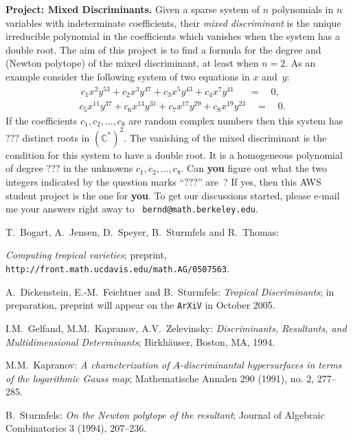 \documentclass[12pt]{amsart}
\newcommand{\baseRing}[1]{\ensuremath{\mathbb{#1}}}
\newcommand{\C}{\baseRing{C}}
\theoremstyle{plain}
\theoremstyle{definition}
\numberwithin{equation}{section}
\begin{document}
\bigskip

{\bf Project: Mixed Discriminants.}
Given a sparse system of $n$ polynomials in $n$ variables
with indeterminate  coefficients, their {\em mixed discriminant}
is the unique irreducible polynomial in the coefficients
which vanishes when the system has a double root.
The aim of this project is to find a formula for the degree 
and (Newton polytope) of the mixed discriminant, at least
when $n=2$. As an example consider the 
following system of two equations in $x$ and~$y$:
\begin{eqnarray*}
& \, c_1 x^2 y^{53} + 
c_2 x^3 y^{47} + 
c_3 x^5 y^{43} + 
c_4 x^7 y^{41}\,\,\,
\quad = \quad 0 , \\ &
c_5 x^{11} y^{37} + 
c_6 x^{13} y^{31} + 
c_7 x^{17} y^{29} + 
c_8 x^{19} y^{23}
\quad = \quad 0. 
\end{eqnarray*}
If the coefficients $c_1,c_2,\ldots,c_8$ are random complex
numbers then this system has $???$ distinct roots in $(\C^*)^2$.
The vanishing of the mixed discriminant is the condition
for this system to have a double root.
It is a homogeneous polynomial of degree $???$ in
the unknowns $c_1,c_2,\ldots,c_8$. Can
{\bf you} figure out what the two integers 
indicated by the question marks ``$ ???$'' are~?
If yes, then this AWS student project is the one for {\bf you}.
To get our discussions started, please e-mail me your answers
right away to \
{\tt bernd@math.berkeley.edu}.

\bigskip \bigskip \bigskip

\begin{thebibliography}{10}

 T.~Bogart, A.~Jensen, D.~Speyer, B.~Sturmfels and R.~Thomas: 

{\em Computing tropical varieties}; preprint,
{\tt http://front.math.ucdavis.edu/math.AG/0507563}.



 A.~Dickenstein, E.-M.~Feichtner and B.~Sturmfels:
{\em Tropical Discriminants}; in preparation,  preprint
will appear on the {\tt ArXiV} in October 2005.

  I.M.~Gelfand, M.M.~Kapranov, A.V.~Zelevinsky:
{\em  Discriminants, Resultants, and Multidimensional Determinants\/};
Birkh\"auser, Boston, MA, 1994. 

 M.M.~Kapranov: {\em A characterization of 
$A$-discriminantal hypersurfaces in terms of the logarithmic Gauss map\/};
Mathematische Annalen  290  (1991),  no. 2, 277--285. 

 B.~Sturmfels: {\em On the Newton polytope of the resultant\/}; 
 Journal of Algebraic Combinatorics  3  (1994), 207--236.

\end{thebibliography}
\end{document}
